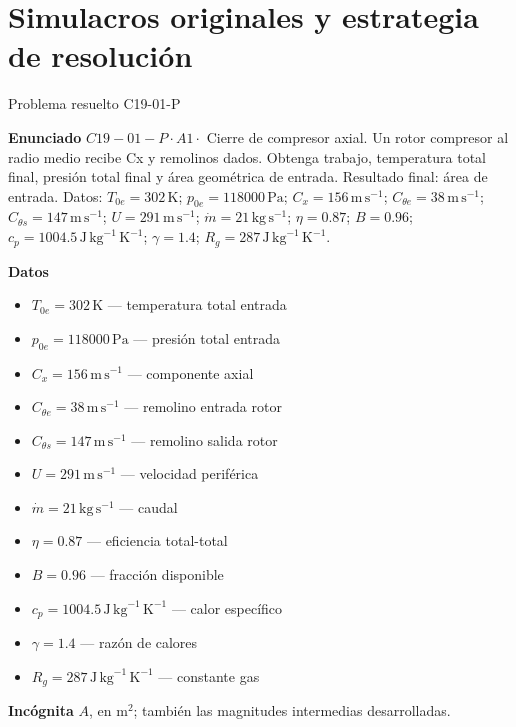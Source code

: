 \documentclass[10pt,openany]{book}
\begin{document}
\chapter{Simulacros originales y estrategia de resolución}
\begin{studiumworked}{Problema resuelto C19-01-P}


\noindent\textbf{Enunciado}
\(C19-01-P \cdot A1 \cdot\) Cierre de compresor axial. Un rotor compresor al radio medio recibe Cx y remolinos dados. Obtenga trabajo, temperatura total final, presión total final y área geométrica de entrada. Resultado final: área de entrada. Datos: \(T_{0e}=302\, \mathrm{K}\); \(p_{0e}=118000\, \mathrm{Pa}\); \(C_x=156\, \mathrm{m}\,\mathrm{s}^{-1}\); \(C_{\theta e}=38\, \mathrm{m}\,\mathrm{s}^{-1}\); \(C_{\theta s}=147\, \mathrm{m}\,\mathrm{s}^{-1}\); \(U=291\, \mathrm{m}\,\mathrm{s}^{-1}\); \(\dot m=21\, \mathrm{kg}\,\mathrm{s}^{-1}\); \(\eta=0.87\); \(B=0.96\); \(c_p=1004.5\, \mathrm{J}\,\mathrm{kg}^{-1}\,\mathrm{K}^{-1}\); \(\gamma=1.4\); \(R_g=287\, \mathrm{J}\,\mathrm{kg}^{-1}\,\mathrm{K}^{-1}\).

\noindent\textbf{Datos}
\begin{itemize}
\item $T_{0e} = 302\,\mathrm{K}$ — temperatura total entrada
\item $p_{0e} = 118000\,\mathrm{Pa}$ — presión total entrada
\item $C_x = 156\,\mathrm{m}\,\mathrm{s}^{-1}$ — componente axial
\item $C_{\theta e} = 38\,\mathrm{m}\,\mathrm{s}^{-1}$ — remolino entrada rotor
\item $C_{\theta s} = 147\,\mathrm{m}\,\mathrm{s}^{-1}$ — remolino salida rotor
\item $U = 291\,\mathrm{m}\,\mathrm{s}^{-1}$ — velocidad periférica
\item $\dot m = 21\,\mathrm{kg}\,\mathrm{s}^{-1}$ — caudal
\item $\eta = 0.87$ — eficiencia total-total
\item $B = 0.96$ — fracción disponible
\item $c_p = 1004.5\,\mathrm{J}\,\mathrm{kg}^{-1}\,\mathrm{K}^{-1}$ — calor específico
\item $\gamma = 1.4$ — razón de calores
\item $R_g = 287\,\mathrm{J}\,\mathrm{kg}^{-1}\,\mathrm{K}^{-1}$ — constante gas
\end{itemize}

\noindent\textbf{Incógnita}
$A$, en $\mathrm{m^{2}}$; también las magnitudes intermedias desarrolladas.


\end{studiumworked}
\end{document}
